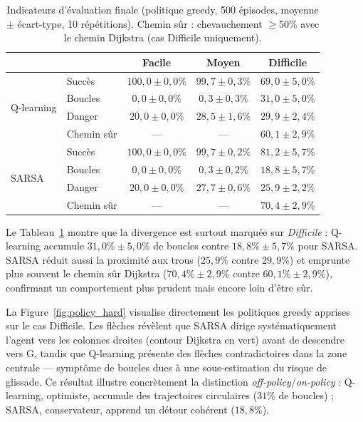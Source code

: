 \documentclass{article}
\begin{document}
\begin{table}[H]
  \centering
  \begin{minipage}[c]{0.60\linewidth}
    \caption{Indicateurs d'évaluation finale (politique greedy, 500 épisodes, moyenne $\pm$ écart-type, 10 répétitions). Chemin sûr : chevauchement $\geq 50\%$ avec le chemin Dijkstra (cas Difficile uniquement).}
    \label{tab:eval}
    \scriptsize
    \begin{tabular}{llccc}
      \toprule
      & & \textbf{Facile} & \textbf{Moyen} & \textbf{Difficile} \\
      \midrule
      \multirow{4}{*}{Q-learning}
        & Succès      & $100{,}0 \pm 0{,}0\%$ & $99{,}7 \pm 0{,}3\%$ & $69{,}0 \pm 5{,}0\%$ \\
        & Boucles     & $0{,}0 \pm 0{,}0\%$   & $0{,}3 \pm 0{,}3\%$  & $31{,}0 \pm 5{,}0\%$ \\
        & Danger      & $20{,}0 \pm 0{,}0\%$  & $28{,}5 \pm 1{,}6\%$ & $29{,}9 \pm 2{,}4\%$ \\
        & Chemin sûr  & ---                   & ---                  & $60{,}1 \pm 2{,}9\%$ \\
      \midrule
      \multirow{4}{*}{SARSA}
        & Succès      & $100{,}0 \pm 0{,}0\%$ & $99{,}7 \pm 0{,}2\%$ & $81{,}2 \pm 5{,}7\%$ \\
        & Boucles     & $0{,}0 \pm 0{,}0\%$   & $0{,}3 \pm 0{,}2\%$  & $18{,}8 \pm 5{,}7\%$ \\
        & Danger      & $20{,}0 \pm 0{,}0\%$  & $27{,}7 \pm 0{,}6\%$ & $25{,}9 \pm 2{,}2\%$ \\
        & Chemin sûr  & ---                   & ---                  & $70{,}4 \pm 2{,}9\%$ \\
      \bottomrule
    \end{tabular}
  \end{minipage}\hfill
  \begin{minipage}[c]{0.37\linewidth}
    \small
    Le Tableau~\ref{tab:eval} montre que la divergence est surtout marquée sur \textit{Difficile} : Q-learning accumule $31{,}0\% \pm 5{,}0\%$ de boucles contre $18{,}8\% \pm 5{,}7\%$ pour SARSA. SARSA réduit aussi la proximité aux trous ($25{,}9\%$ contre $29{,}9\%$) et emprunte plus souvent le chemin sûr Dijkstra ($70{,}4\% \pm 2{,}9\%$ contre $60{,}1\% \pm 2{,}9\%$), confirmant un comportement plus prudent mais encore loin d'être sûr.
  \end{minipage}
\end{table}

La Figure~\ref{fig:policy_hard} visualise directement les politiques greedy apprises sur le cas Difficile. Les flèches révèlent que SARSA dirige systématiquement l'agent vers les colonnes droites (contour Dijkstra en vert) avant de descendre vers G, tandis que Q-learning présente des flèches contradictoires dans la zone centrale — symptôme de boucles dues à une sous-estimation du risque de glissade. Ce résultat illustre concrètement la distinction \textit{off-policy}/\textit{on-policy} : Q-learning, optimiste, accumule des trajectoires circulaires ($31\%$ de boucles) ; SARSA, conservateur, apprend un détour cohérent ($18{,}8\%$).
\end{document}
